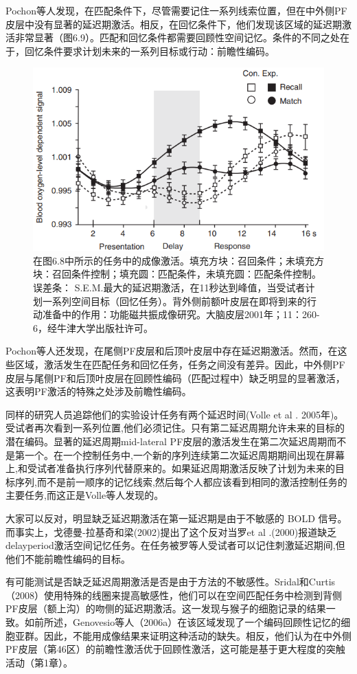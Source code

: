 Pochon等人发现，在匹配条件下，尽管需要记住一系列线索位置，但在中外侧PF皮层中没有显著的延迟期激活。相反，在回忆条件下，他们发现该区域的延迟期激活非常显著（图6.9）。匹配和回忆条件都需要回顾性空间记忆。条件的不同之处在于，回忆条件要求计划未来的一系列目标或行动：前瞻性编码。
\begin{figure}
	\centering
	\includegraphics[width=0.6\linewidth]{image_pfc/Fig_6_9}
	\caption{在图6.8中所示的任务中的成像激活。填充方块：召回条件；未填充方块：召回条件控制；填充圆：匹配条件，未填充圆：匹配条件控制。误差条： S.E.M.最大的延迟期激活，在11秒达到峰值，当受试者计划一系列空间目标（回忆任务）。背外侧前额叶皮层在即将到来的行动准备中的作用：功能磁共振成像研究。大脑皮层2001年；11：260-6，经牛津大学出版社许可。}
	\label{fig:fig}
\end{figure}
Pochon等人还发现，在尾侧PF皮层和后顶叶皮层中存在延迟期激活。然而，在这些区域，激活发生在匹配任务和回忆任务，任务之间没有差异。因此，中外侧PF皮层与尾侧PF和后顶叶皮层在回顾性编码（匹配过程中）缺乏明显的显著激活，这表明PF激活的特殊之处涉及前瞻性编码。

同样的研究人员追踪他们的实验设计任务有两个延迟时间(Volle et al . 2005年)。受试者再次看到一系列位置,他们必须记住。只有第二延迟周期允许未来的目标的潜在编码。显著的延迟周期mid-lateral PF皮层的激活发生在第二次延迟周期而不是第一个。在一个控制任务中,一个新的序列连续第二次延迟周期期间出现在屏幕上,和受试者准备执行序列代替原来的。如果延迟周期激活反映了计划为未来的目标序列,而不是前一顺序的记忆线索,然后每个人都应该看到相同的激活控制任务的主要任务,而这正是Volle等人发现的。

大家可以反对，明显缺乏延迟期激活在第一延迟期是由于不敏感的 BOLD 信号。而事实上，戈德曼-拉基奇和梁(2002)提出了这个反对当罗et al .(2000)报道缺乏delayperiod激活空间记忆任务。在任务被罗等人受试者可以记住刺激延迟期间,但他们不能前瞻性编码的目标。

有可能测试是否缺乏延迟周期激活是否是由于方法的不敏感性。Sridal和Curtis（2008）使用特殊的线圈来提高敏感性，他们可以在空间匹配任务中检测到背侧PF皮层（额上沟）的吻侧的延迟期激活。这一发现与猴子的细胞记录的结果一致。如前所述，Genovesio等人（2006a）在该区域发现了一个编码回顾性记忆的细胞亚群。因此，不能用成像结果来证明这种活动的缺失。相反，他们认为在中外侧PF皮层（第46区）的前瞻性激活优于回顾性激活，这可能是基于更大程度的突触活动（第1章）。

